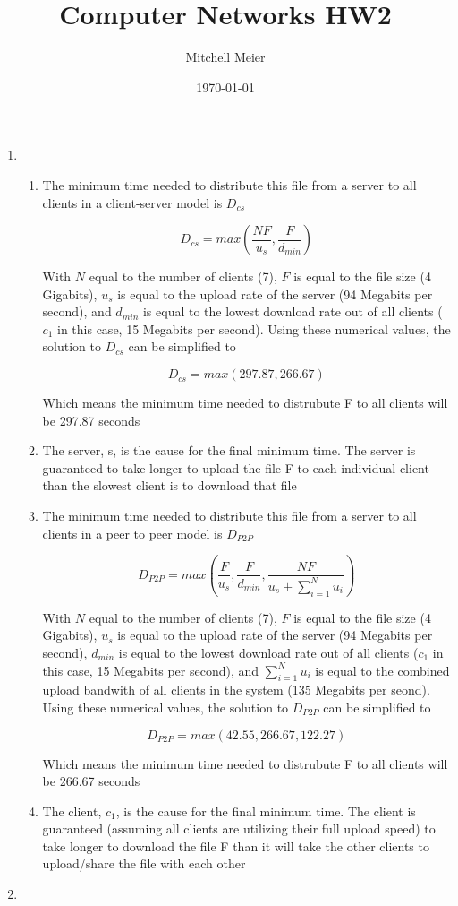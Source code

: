 \documentclass[14pt]{article}
\title{Computer Networks HW2}
\author{Mitchell Meier}
\date{\today}
\begin{document}
\maketitle

\begin{enumerate}

\item
\begin{enumerate}[(1)]
\item
The minimum time needed to distribute this file from a server to all clients in a client-server model is $D_{cs}$  

\[D_{cs} = max(\frac{NF}{u_s},\frac{F}{d_{min}})\]

With $N$ equal to the number of clients (7), $F$ is equal to the file size (4 Gigabits), $u_s$ is equal to the upload rate of the server (94 Megabits per second), and $d_{min}$ is equal to the lowest download rate out of all clients ($c_1$ in this case, 15 Megabits per second). Using these numerical values, the solution to $D_{cs}$ can be simplified to

\[D_{cs} = max(297.87,266.67)\]

Which means the minimum time needed to distrubute F to all clients will be 297.87 seconds \\

\item
The server, s, is the cause for the final minimum time. The server is guaranteed to take longer to upload the file F to each individual client than the slowest client is to download that file \\

\item
The minimum time needed to distribute this file from a server to all clients in a peer to peer model is $D_{P2P}$

\[D_{P2P} = max(\frac{F}{u_s},\frac{F}{d_{min}},\frac{NF}{u_s + \sum\limits_{i=1}^{N} u_i})\] 

With $N$ equal to the number of clients (7), $F$ is equal to the file size (4 Gigabits), $u_s$ is equal to the upload rate of the server (94 Megabits per second), $d_{min}$ is equal to the lowest download rate out of all clients ($c_1$ in this case, 15 Megabits per second), and $\sum_{i=1}^{N} u_i$ is equal to the combined upload bandwith of all clients in the system (135 Megabits per seond). Using these numerical values, the solution to $D_{P2P}$ can be simplified to 

\[D_{P2P} = max(42.55,266.67,122.27)\] 

Which means the minimum time needed to distrubute F to all clients will be 266.67 seconds \\

\item
The client, $c_1$, is the cause for the final minimum time. The client is guaranteed (assuming all clients are utilizing their full upload speed) to take longer to download the file F than it will take the other clients to upload/share the file with each other \\
\end{enumerate}

\item
\end{enumerate}
\end{document}
